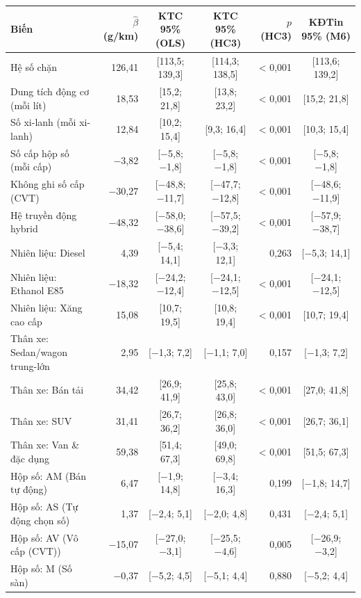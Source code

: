 \begin{tabular}{@{}l r c c r c@{}}
\toprule
Biến & $\hat\beta$ (g/km) & KTC 95\% (OLS) & KTC 95\% (HC3) & $p$ (HC3) & KĐTin 95\% (M6) \\
\midrule
Hệ số chặn & 126,41 & [113,5; 139,3] & [114,3; 138,5] & < 0,001 & [113,6; 139,2] \\
Dung tích động cơ (mỗi lít) & 18,53 & [15,2; 21,8] & [13,8; 23,2] & < 0,001 & [15,2; 21,8] \\
Số xi-lanh (mỗi xi-lanh) & 12,84 & [10,2; 15,4] & [9,3; 16,4] & < 0,001 & [10,3; 15,4] \\
Số cấp hộp số (mỗi cấp) & −3,82 & [−5,8; −1,8] & [−5,8; −1,8] & < 0,001 & [−5,8; −1,8] \\
Không ghi số cấp (CVT) & −30,27 & [−48,8; −11,7] & [−47,7; −12,8] & < 0,001 & [−48,6; −11,9] \\
Hệ truyền động hybrid & −48,32 & [−58,0; −38,6] & [−57,5; −39,2] & < 0,001 & [−57,9; −38,7] \\
Nhiên liệu: Diesel & 4,39 & [−5,4; 14,1] & [−3,3; 12,1] & 0,263 & [−5,3; 14,1] \\
Nhiên liệu: Ethanol E85 & −18,32 & [−24,2; −12,4] & [−24,1; −12,5] & < 0,001 & [−24,1; −12,5] \\
Nhiên liệu: Xăng cao cấp & 15,08 & [10,7; 19,5] & [10,8; 19,4] & < 0,001 & [10,7; 19,4] \\
Thân xe: Sedan/wagon trung-lớn & 2,95 & [−1,3; 7,2] & [−1,1; 7,0] & 0,157 & [−1,3; 7,2] \\
Thân xe: Bán tải & 34,42 & [26,9; 41,9] & [25,8; 43,0] & < 0,001 & [27,0; 41,8] \\
Thân xe: SUV & 31,41 & [26,7; 36,2] & [26,8; 36,0] & < 0,001 & [26,7; 36,1] \\
Thân xe: Van \& đặc dụng & 59,38 & [51,4; 67,3] & [49,0; 69,8] & < 0,001 & [51,5; 67,3] \\
Hộp số: AM (Bán tự động) & 6,47 & [−1,9; 14,8] & [−3,4; 16,3] & 0,199 & [−1,8; 14,7] \\
Hộp số: AS (Tự động chọn số) & 1,37 & [−2,4; 5,1] & [−2,0; 4,8] & 0,431 & [−2,4; 5,1] \\
Hộp số: AV (Vô cấp (CVT)) & −15,07 & [−27,0; −3,1] & [−25,5; −4,6] & 0,005 & [−26,9; −3,2] \\
Hộp số: M (Số sàn) & −0,37 & [−5,2; 4,5] & [−5,1; 4,4] & 0,880 & [−5,2; 4,4] \\
\bottomrule
\end{tabular}
